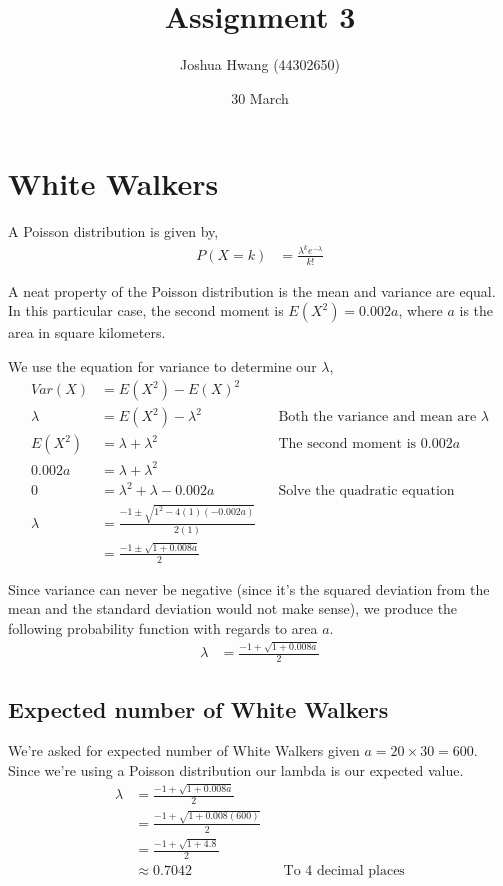 \documentclass{article}
\title{Assignment 3}
\author{Joshua Hwang (44302650)}
\date{30 March}
\begin{document}
\maketitle

\section{White Walkers}
A Poisson distribution is given by,
\begin{align*}
    P(X=k) &= \frac{\lambda^k e^{-\lambda}}{k!}
\end{align*}

A neat property of the Poisson distribution is the mean and variance are
equal. In this particular case, the second moment is $E(X^2)=0.002a$, where
$a$ is the area in square kilometers.

We use the equation for variance to determine our $\lambda$,
\begin{align*}
    Var(X) &= E(X^2) - E(X)^2 \\
    \lambda &= E(X^2) - \lambda^2
    && \text{Both the variance and mean are $\lambda$} \\
    E(X^2) &= \lambda + \lambda^2 && \text{The second moment is $0.002a$} \\
    0.002a &= \lambda + \lambda^2 \\
    0 &= \lambda^2 + \lambda - 0.002a && \text{Solve the quadratic equation} \\
    \lambda &= \frac{-1 \pm \sqrt{1^2 - 4(1)(-0.002a)}}{2(1)} \\
    &= \frac{-1 \pm \sqrt{1 + 0.008a}}{2}
\end{align*}

Since variance can never be negative (since it's the squared deviation from the
mean and the standard deviation would not make sense), we produce the following
probability function with regards to area $a$.
\begin{align*}
    \lambda &= \frac{-1 + \sqrt{1 + 0.008a}}{2}
\end{align*}

\subsection{Expected number of White Walkers}
We're asked for expected number of White Walkers given $a=20\times30=600$.
Since we're using a Poisson distribution our lambda is our expected value.
\begin{align*}
    \lambda &= \frac{-1 + \sqrt{1 + 0.008a}}{2} \\
    &= \frac{-1 + \sqrt{1 + 0.008(600)}}{2} \\
    &= \frac{-1 + \sqrt{1 + 4.8}}{2} \\
    &\approx 0.7042 && \text{To 4 decimal places}
\end{align*}
\end{document}

